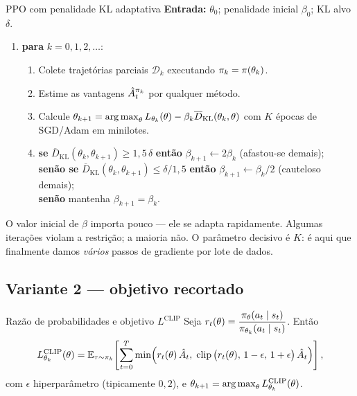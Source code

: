 \documentclass[11pt, a4paper]{article}
\newcommand{\Ahat}{\hat{A}}
\newcommand{\KLbar}{\overline{D}_{\mathrm{KL}}}
\DeclareMathOperator{\clipop}{clip}
\newcommand{\Lsub}[1]{L_{#1}}
\begin{document}
\begin{algbox}{PPO com penalidade KL adaptativa}
\textbf{Entrada:} $\theta_0$; penalidade inicial $\beta_0$; KL alvo $\delta$.
\begin{enumerate}[leftmargin=1.6em, itemsep=0.1em]
  \item \textbf{para} $k = 0,1,2,\dots$:
  \begin{enumerate}[leftmargin=1.4em, itemsep=0.05em, label=\alph*)]
    \item Colete trajetórias parciais $\mathcal{D}_k$ executando $\pi_k = \pi(\theta_k)$.
    \item Estime as vantagens $\Ahat_t^{\pol_k}$ por qualquer método.
    \item Calcule $\theta_{k+1} = \argmax_\theta \Lsub{\theta_k}(\theta)
          - \beta_k \KLbar(\theta_k,\theta)$ com $K$ épocas de SGD/Adam em
          minilotes.
    \item \textbf{se} $\KLbar(\theta_k,\theta_{k+1}) \ge 1{,}5\,\delta$
          \textbf{então} $\beta_{k+1} \leftarrow 2\beta_k$ (afastou-se demais); \\
          \textbf{senão se} $\KLbar(\theta_k,\theta_{k+1}) \le \delta/1{,}5$
          \textbf{então} $\beta_{k+1} \leftarrow \beta_k/2$ (cauteloso demais); \\
          \textbf{senão} mantenha $\beta_{k+1} = \beta_k$.
  \end{enumerate}
\end{enumerate}
\end{algbox}

O valor inicial de $\beta$ importa pouco --- ele se adapta rapidamente. Algumas
iterações violam a restrição; a maioria não. O parâmetro decisivo é $K$: é aqui
que finalmente damos \emph{vários} passos de gradiente por lote de dados.

\subsection{Variante 2 --- objetivo recortado}

\begin{defbox}{Razão de probabilidades e objetivo $L^{\mathrm{CLIP}}$}
Seja $r_t(\theta) = \dfrac{\pi_\theta(a_t\mid s_t)}{\pi_{\theta_k}(a_t\mid s_t)}$. Então
\[
  L^{\mathrm{CLIP}}_{\theta_k}(\theta) = \E_{\tau\sim\pol_k}\!\left[
    \sum_{t=0}^{T}
    \min\!\Big(r_t(\theta)\,\Ahat_t,\;
    \clipop\big(r_t(\theta),\, 1-\epsilon,\, 1+\epsilon\big)\,\Ahat_t\Big)\right],
\]
com $\epsilon$ hiperparâmetro (tipicamente $0{,}2$), e
$\theta_{k+1} = \operatorname*{arg\,max}_\theta L^{\mathrm{CLIP}}_{\theta_k}(\theta)$.
\end{defbox}
\end{document}
